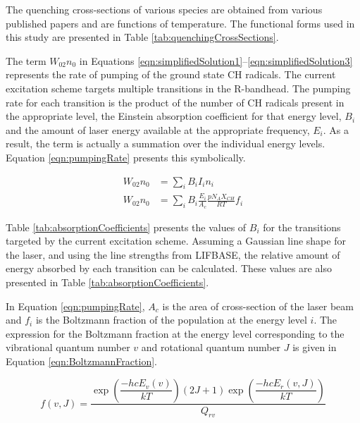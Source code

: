 The quenching cross-sections of various species are obtained from various published papers\cite{1994-chen,1998-tamura,2002-renfro} and are functions of temperature.
The functional forms used in this study are presented in Table \ref{tab:quenchingCrossSections}.



The term \(W_{02}n_0\) in Equations \ref{eqn:simplifiedSolution1}--\ref{eqn:simplifiedSolution3} represents the rate of pumping of the ground state CH radicals.
The current excitation scheme targets multiple transitions in the R-bandhead.
The pumping rate for each transition is the product of the number of CH radicals present in the appropriate level, the Einstein absorption coefficient for that energy level, \(B_i\) and the amount of laser energy available at the appropriate frequency, \(E_i\).
As a result, the term is actually a summation over the individual energy levels.
Equation \ref{eqn:pumpingRate} presents this symbolically.

\begin{align}
  W_{02}n_0 &= \sum_i B_i I_i n_i \nonumber \\
  W_{02}n_0 &= \sum_i B_i \frac{ E_i }{ A_c } \frac{ pN_A X_{CH} }{ RT } f_i
  \label{eqn:pumpingRate}
\end{align}

Table \ref{tab:absorptionCoefficients} presents the values of \(B_i\) for the transitions targeted by the current excitation scheme.\cite{1996-luque-c}
Assuming a Gaussian line shape for the laser, and using the line strengths from LIFBASE, the relative amount of energy absorbed by each transition can be calculated.
These values are also presented in Table \ref{tab:absorptionCoefficients}.



In Equation \ref{eqn:pumpingRate}, \(A_c\) is the area of cross-section of the laser beam and \(f_i\) is the Boltzmann fraction of the population at the energy level \(i\).
The expression for the Boltzmann fraction at the energy level corresponding to the vibrational quantum number \(v\) and rotational quantum number \(J\) is given in Equation \ref{eqn:BoltzmannFraction}.

\begin{equation}
  f(v,J) = \frac{ \exp{\left(\dfrac{-hcE_v(v)}{kT}\right)} (2J + 1)\exp{\left(\dfrac{-hcE_r(v, J)}{kT}\right)} }{ Q_{rv} }
  \label{eqn:BoltzmannFraction}
\end{equation}

